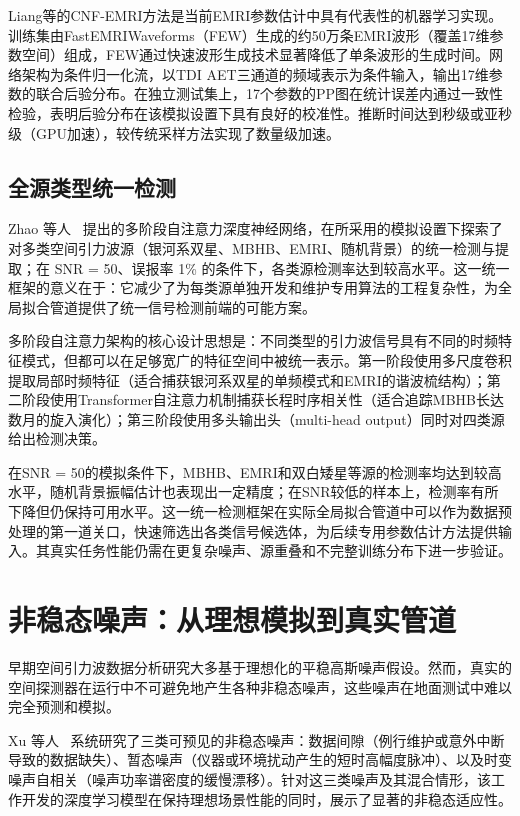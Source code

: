 Liang等的CNF-EMRI方法是当前EMRI参数估计中具有代表性的机器学习实现。训练集由FastEMRIWaveforms（FEW）生成的约50万条EMRI波形（覆盖17维参数空间）组成，FEW通过快速波形生成技术显著降低了单条波形的生成时间。网络架构为条件归一化流，以TDI AET三通道的频域表示为条件输入，输出17维参数的联合后验分布。在独立测试集上，17个参数的PP图在统计误差内通过一致性检验，表明后验分布在该模拟设置下具有良好的校准性。推断时间达到秒级或亚秒级（GPU加速），较传统采样方法实现了数量级加速。

\subsection{全源类型统一检测}

Zhao 等人~\cite{zhao2023spacegw} 提出的多阶段自注意力深度神经网络，在所采用的模拟设置下探索了对多类空间引力波源（银河系双星、MBHB、EMRI、随机背景）的统一检测与提取；在 SNR = 50、误报率 1\% 的条件下，各类源检测率达到较高水平。这一统一框架的意义在于：它减少了为每类源单独开发和维护专用算法的工程复杂性，为全局拟合管道提供了统一信号检测前端的可能方案。

多阶段自注意力架构的核心设计思想是：不同类型的引力波信号具有不同的时频特征模式，但都可以在足够宽广的特征空间中被统一表示。第一阶段使用多尺度卷积提取局部时频特征（适合捕获银河系双星的单频模式和EMRI的谐波梳结构）；第二阶段使用Transformer自注意力机制捕获长程时序相关性（适合追踪MBHB长达数月的旋入演化）；第三阶段使用多头输出头（multi-head output）同时对四类源给出检测决策。

在SNR = 50的模拟条件下，MBHB、EMRI和双白矮星等源的检测率均达到较高水平，随机背景振幅估计也表现出一定精度；在SNR较低的样本上，检测率有所下降但仍保持可用水平。这一统一检测框架在实际全局拟合管道中可以作为数据预处理的第一道关口，快速筛选出各类信号候选体，为后续专用参数估计方法提供输入。其真实任务性能仍需在更复杂噪声、源重叠和不完整训练分布下进一步验证。

\section{非稳态噪声：从理想模拟到真实管道}

早期空间引力波数据分析研究大多基于理想化的平稳高斯噪声假设。然而，真实的空间探测器在运行中不可避免地产生各种非稳态噪声，这些噪声在地面测试中难以完全预测和模拟。

Xu 等人~\cite{xu2024nonstationarty} 系统研究了三类可预见的非稳态噪声：数据间隙（例行维护或意外中断导致的数据缺失）、暂态噪声（仪器或环境扰动产生的短时高幅度脉冲）、以及时变噪声自相关（噪声功率谱密度的缓慢漂移）。针对这三类噪声及其混合情形，该工作开发的深度学习模型在保持理想场景性能的同时，展示了显著的非稳态适应性。

